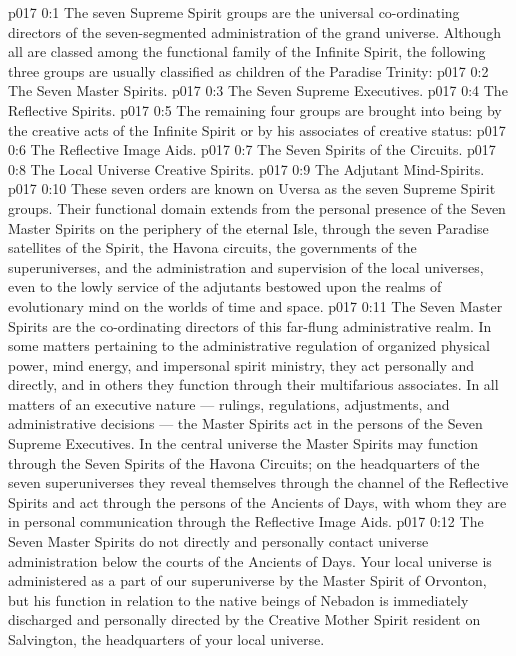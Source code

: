 \author{Divine Counsellor}
\vs p017 0:1 The seven Supreme Spirit groups are the universal co\hyp{}ordinating directors of the seven\hyp{}segmented administration of the grand universe. Although all are classed among the functional family of the Infinite Spirit, the following three groups are usually classified as children of the Paradise Trinity:
\vs p017 0:2 \bibnobreakspace The Seven Master Spirits.
\vs p017 0:3 \bibnobreakspace The Seven Supreme Executives.
\vs p017 0:4 \bibnobreakspace The Reflective Spirits.
\vs p017 0:5 \pc The remaining four groups are brought into being by the creative acts of the Infinite Spirit or by his associates of creative status:
\vs p017 0:6 \bibnobreakspace The Reflective Image Aids.
\vs p017 0:7 \bibnobreakspace The Seven Spirits of the Circuits.
\vs p017 0:8 \bibnobreakspace The Local Universe Creative Spirits.
\vs p017 0:9 \bibnobreakspace The Adjutant Mind\hyp{}Spirits.
\vs p017 0:10 \pc These seven orders are known on Uversa as the seven Supreme Spirit groups. Their functional domain extends from the personal presence of the Seven Master Spirits on the periphery of the eternal Isle, through the seven Paradise satellites of the Spirit, the Havona circuits, the governments of the superuniverses, and the administration and supervision of the local universes, even to the lowly service of the adjutants bestowed upon the realms of evolutionary mind on the worlds of time and space.
\vs p017 0:11 The Seven Master Spirits are the co\hyp{}ordinating directors of this far\hyp{}flung administrative realm. In some matters pertaining to the administrative regulation of organized physical power, mind energy, and impersonal spirit ministry, they act personally and directly, and in others they function through their multifarious associates. In all matters of an executive nature --- rulings, regulations, adjustments, and administrative decisions --- the Master Spirits act in the persons of the Seven Supreme Executives. In the central universe the Master Spirits may function through the Seven Spirits of the Havona Circuits; on the headquarters of the seven superuniverses they reveal themselves through the channel of the Reflective Spirits and act through the persons of the Ancients of Days, with whom they are in personal communication through the Reflective Image Aids.
\vs p017 0:12 The Seven Master Spirits do not directly and personally contact universe administration below the courts of the Ancients of Days. Your local universe is administered as a part of our superuniverse by the Master Spirit of Orvonton, but his function in relation to the native beings of Nebadon is immediately discharged and personally directed by the Creative Mother Spirit resident on Salvington, the headquarters of your local universe.
